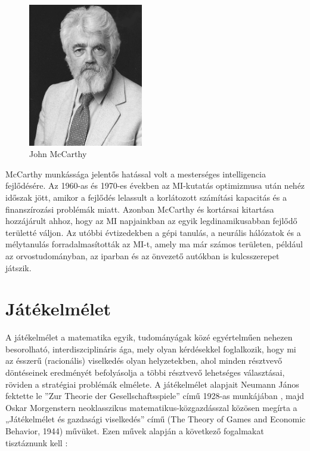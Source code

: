\documentclass[
]{thesis-ekf}
\theoremstyle{definition}
\theoremstyle{remark}
\begin{document}
\begin{figure}[h!]
	\centering
	\includegraphics[width=5cm]{./pictures/John_McCarthy.png}
	\caption{John McCarthy}
	\label{McCarthy}
\end{figure}

McCarthy munkássága jelentős hatással volt a mesterséges intelligencia fejlődésére. Az 1960-as és 1970-es években az MI-kutatás optimizmusa után nehéz időszak jött, amikor a fejlődés lelassult a korlátozott számítási kapacitás és a finanszírozási problémák miatt. Azonban McCarthy és kortársai kitartása hozzájárult ahhoz, hogy az MI napjainkban az egyik legdinamikusabban fejlődő területté váljon. Az utóbbi évtizedekben a gépi tanulás, a neurális hálózatok és a mélytanulás forradalmasították az MI-t, amely ma már számos területen, például az orvostudományban, az iparban és az önvezető autókban is kulcsszerepet játszik. \cite{JohnMcCarthy}

\section{Játékelmélet} \label{game-theory}

A játékelmélet a matematika egyik, tudományágak közé egyértelműen nehezen besorolható, interdiszciplináris ága, mely olyan kérdésekkel foglalkozik, hogy mi az ésszerű (racionális) viselkedés olyan helyzetekben, ahol minden résztvevő döntéseinek eredményét befolyásolja a többi résztvevő lehetséges választásai, röviden a stratégiai problémák elmélete. A játékelmélet alapjait Neumann János fektette le ''Zur Theorie der Gesellschaftsspiele'' című 1928-as munkájában \cite{Neumann}, majd Oskar Morgenstern neoklasszikus matematikus-közgazdásszal közösen megírta a „Játékelmélet és gazdasági viselkedés” című (The Theory of Games and Economic Behavior, 1944) művüket. \cite{Jatekelmelet,JatekelmeletEn} Ezen művek alapján a következő fogalmakat tisztáznunk kell \cite{NeumannOskar}:
\end{document}
